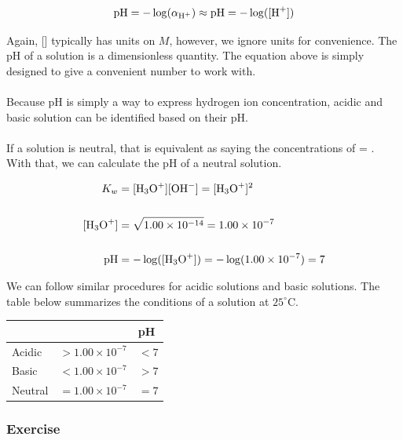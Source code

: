 \documentclass[12pt]{article}
\newcommand\T{\rule{0pt}{5.0ex}}       %
\newcommand\B{\rule[-4.0ex]{0pt}{0pt}} %
\begin{document}
\begin{equation}
    \text{pH} = -\log(\alpha_{\ce{H+}}) \approx \text{pH} = -\log([\ce{H+}])
\end{equation}

\noindent Again, [] typically has units on $M$, however, we ignore units for convenience. The pH of a solution is a dimensionless quantity. The equation above is simply designed to give a convenient number to work with.
\\
\\
\noindent Because pH is simply a way to express hydrogen ion concentration, acidic and basic solution can be identified based on their pH.
\\
\\
\noindent If a solution is neutral, that is equivalent as saying the concentrations of  = . With that, we can calculate the pH of a neutral solution.

\begin{align*}
    K_{w} &= [\ce{H3O+}][\ce{OH-}] = [\ce{H3O+}]^{2} \\
    \\
    [\ce{H3O+}] &= \sqrt{1.00 \times 10^{-14}} = 1.00 \times 10^{-7} \\
    \\
    \text{pH} &= -\log([\ce{H3O+}]) = -\log(1.00\times10^{-7}) = 7\\
\end{align*}

\noindent We can follow similar procedures for acidic solutions and basic solutions. The table below summarizes the conditions of a solution at $25^{\circ}$C.

\begin{center}
\begin{tabularx}{0.8\textwidth}{| >{\centering\arraybackslash}X | >{\centering\arraybackslash}X | >{\centering\arraybackslash}X |}
\hline
   & [\ce{H+}] & pH \T\B \\
 \hline
 Acidic	 & $> 1.00 \times 10^{-7}$ &  $< 7$ \T\B \\  
 \hline
 Basic  & $< 1.00 \times 10^{-7}$ &  $> 7$ \T\B \\
  \hline
 Neutral & $= 1.00 \times 10^{-7}$ &  $= 7$  \T\B \\
  \hline
\end{tabularx}
\end{center}

\subsubsection{Exercise}
\end{document}
